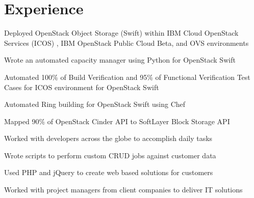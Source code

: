 \documentclass[letterpaper]{resume} %
\begin{document}
\begin{minipage}[t]{0.66\textwidth} %


\section{Experience}

\vspace{\topsep} %
\begin{tightitemize}
\item Deployed OpenStack Object Storage (Swift) within IBM Cloud OpenStack Services (ICOS) , IBM OpenStack Public Cloud Beta, and OVS environments
\item Wrote an automated capacity manager using Python for OpenStack Swift
\item Automated 100\% of Build Verification and 95\% of Functional Verification Test Cases for ICOS environment for OpenStack Swift
\item Automated Ring building for OpenStack Swift using Chef
\item Mapped 90\% of OpenStack Cinder API to SoftLayer Block Storage API
\item Worked with developers across the globe to accomplish daily tasks
\end{tightitemize}

\sectionspace %



\begin{tightitemize}
\item Wrote scripts to perform custom CRUD jobs against customer data
\item Used PHP and jQuery to create web based solutions for customers
\item Worked with project managers from client companies to deliver IT solutions
\end{tightitemize}


\end{minipage}
\end{document}
